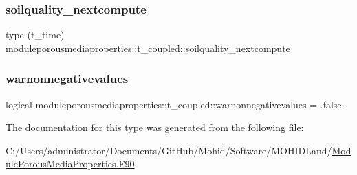 \subsubsection{\texorpdfstring{soilquality\+\_\+nextcompute}{soilquality\_nextcompute}}
{\footnotesize\ttfamily type (t\+\_\+time) moduleporousmediaproperties\+::t\+\_\+coupled\+::soilquality\+\_\+nextcompute\hspace{0.3cm}{\ttfamily [private]}}

\mbox{\label{structmoduleporousmediaproperties_1_1t__coupled_a5a84a6d4b232ec73afb1ae78388f6d4f}} 
\subsubsection{\texorpdfstring{warnonnegativevalues}{warnonnegativevalues}}
{\footnotesize\ttfamily logical moduleporousmediaproperties\+::t\+\_\+coupled\+::warnonnegativevalues = .false.\hspace{0.3cm}{\ttfamily [private]}}



The documentation for this type was generated from the following file\+:\begin{DoxyCompactItemize}
\item 
C\+:/\+Users/administrator/\+Documents/\+Git\+Hub/\+Mohid/\+Software/\+M\+O\+H\+I\+D\+Land/\mbox{\hyperlink{_module_porous_media_properties_8_f90}{Module\+Porous\+Media\+Properties.\+F90}}\end{DoxyCompactItemize}

